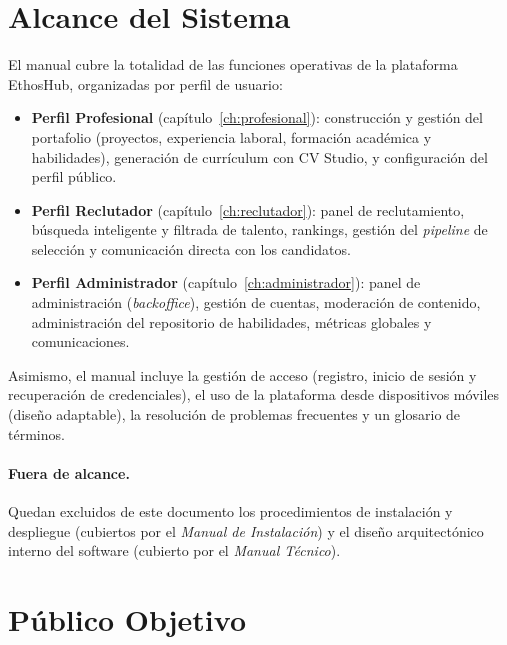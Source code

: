\section{Alcance del Sistema}
\label{sec:alcance}

El manual cubre la totalidad de las funciones operativas de la plataforma EthosHub,
organizadas por perfil de usuario:

\begin{itemize}[noitemsep]
    \item \textbf{Perfil Profesional} (capítulo~\ref{ch:profesional}): construcción y
    gestión del portafolio (proyectos, experiencia laboral, formación académica y
    habilidades), generación de currículum con CV Studio, y configuración del perfil
    público.
    \item \textbf{Perfil Reclutador} (capítulo~\ref{ch:reclutador}): panel de
    reclutamiento, búsqueda inteligente y filtrada de talento, rankings, gestión del
    \textit{pipeline} de selección y comunicación directa con los candidatos.
    \item \textbf{Perfil Administrador} (capítulo~\ref{ch:administrador}): panel de
    administración (\textit{backoffice}), gestión de cuentas, moderación de contenido,
    administración del repositorio de habilidades, métricas globales y comunicaciones.
\end{itemize}

Asimismo, el manual incluye la gestión de acceso (registro, inicio de sesión y
recuperación de credenciales), el uso de la plataforma desde dispositivos móviles
(diseño adaptable), la resolución de problemas frecuentes y un glosario de términos.

\paragraph{Fuera de alcance.} Quedan excluidos de este documento los procedimientos de
instalación y despliegue (cubiertos por el \textit{Manual de Instalación}) y el diseño
arquitectónico interno del software (cubierto por el \textit{Manual Técnico}).

\section{Público Objetivo}
\label{sec:publico}

